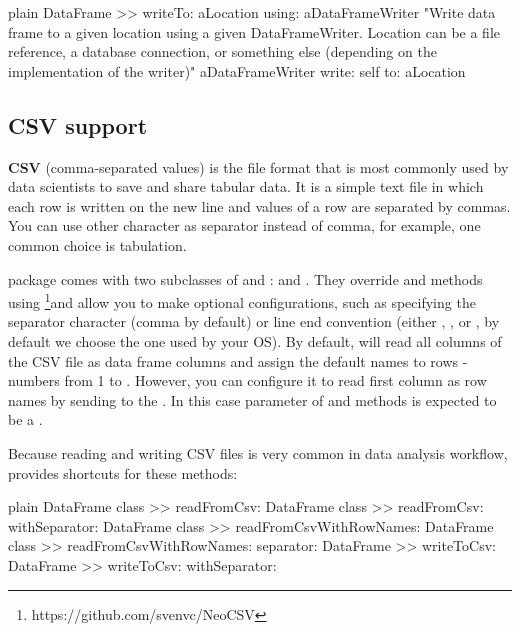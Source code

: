 \documentclass[10pt,twoside,english]{_support/latex/sbabook/sbabook}
\begin{document}
\begin{displaycode}{plain}
DataFrame >> writeTo: aLocation using: aDataFrameWriter
  "Write data frame to a given location using a given DataFrameWriter. Location can be a file reference, a database connection, or something else (depending on the implementation of the writer)"
  aDataFrameWriter write: self to: aLocation
\end{displaycode}
\subsection{CSV support}
\textbf{CSV} (comma-separated values) is the file format that is most commonly used by data scientists to save and share tabular data. It is a simple text file in which each row is written on the new line and values of a row are separated by commas. You can use other character as separator instead of comma, for example, one common choice is tabulation.

 package comes with two subclasses of  and :  and . They override  and  methods using  \footnote{https://github.com/svenvc/NeoCSV}and allow you to make optional configurations, such as specifying the separator character (comma by default) or line end convention (either , , or , by default we choose the one used by your OS). By default,  will read all columns of the CSV file as data frame columns and assign the default names to rows - numbers from 1 to . However, you can configure it to read first column as row names by sending  to the . In this case  parameter of  and  methods is expected to be a .

Because reading and writing CSV files is very common in data analysis workflow,  provides shortcuts for these methods:

\begin{displaycode}{plain}
DataFrame class >> readFromCsv:
DataFrame class >> readFromCsv: withSeparator:
DataFrame class >> readFromCsvWithRowNames:
DataFrame class >> readFromCsvWithRowNames: separator:
DataFrame >> writeToCsv:
DataFrame >> writeToCsv: withSeparator:
\end{displaycode}
\end{document}
